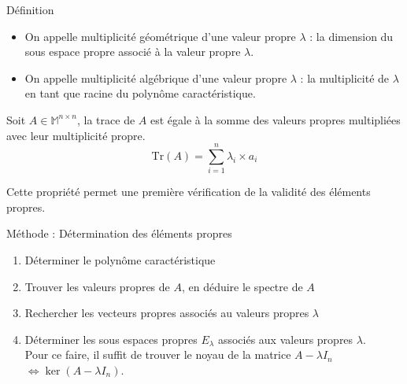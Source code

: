 \begin{bclogo}[couleur=blue!30,couleurBord=blue,arrondi=0.1,logo=\bcbook,ombre=true]{Définition}
\begin{itemize}
    \item On appelle multiplicité géométrique d'une valeur propre $\lambda$ : la dimension du sous espace propre associé à la valeur propre $\lambda$.
    \item On appelle multiplicité algébrique d'une valeur propre $\lambda$ : la multiplicité de $\lambda$ en tant que racine du polynôme caractéristique.
\end{itemize}
\end{bclogo}
\begin{prop}
Soit $A\in\mathbb{M}^{n\times n}$, la trace de $A$ est égale à la somme des valeurs propres multipliées avec leur multiplicité propre.
$$\text{Tr}(A)=\sum_{i=1}^n \lambda_i\times a_i$$
\end{prop}
Cette propriété permet une première vérification de la validité des éléments propres.
\begin{bclogo}[logo=\bclampe,arrondi=0.1,ombre=true, couleur=yellow!60,couleurBord=yellow]{Méthode : Détermination des éléments propres}
\begin{enumerate}
    \item Déterminer le polynôme caractéristique
    \item Trouver les valeurs propres de $A$, en déduire le spectre de $A$
    \item Rechercher les vecteurs propres associés au valeurs propres $\lambda$
    \item Déterminer les sous espaces propres $E_{\lambda}$ associés aux valeurs propres $\lambda$.\\
    Pour ce faire, il suffit de trouver le noyau de la matrice $A-\lambda I_n$ $\Leftrightarrow \ker(A-\lambda I_n)$.\\
\end{enumerate}
\end{bclogo}
